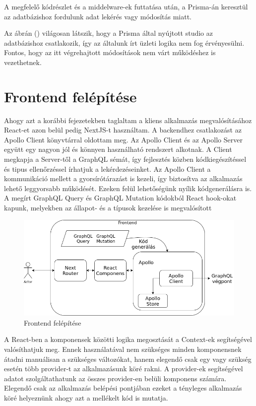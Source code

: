 A megfelelő kódrészlet és a middelware-ek futtatása után, a Prisma-án keresztül az adatbázishoz fordulunk adat lekérés vagy módosítás miatt.

Az ábrán () világosan látszik, hogy a Prisma által nyújtott studio az adatbázishoz csatlakozik, így az általunk írt üzleti logika nem fog érvényesülni.
Fontos, hogy az itt végrehajtott módosítások nem várt működéshez is vezethetnek.


\section{Frontend felépítése}

Ahogy azt a korábbi fejezetekben taglaltam a kliens alkalmazás megvalósításához React-et azon belül pedig NextJS-t használtam.
A backendhez csatlakozást az Apollo Client könyvtárral oldottam meg. 
Az Apollo Client és az Apollo Server együtt egy nagyon jól és könnyen használható rendszert alkotnak.
A Client megkapja a Server-től a GraphQL sémát, így fejlesztés közben kódkiegészítéssel és tipus ellenőrzéssel írhatjuk a lekérdezéseinket.
Az Apollo Client a kommunikáció mellett a gyorsírótárazást is kezeli, így biztosítva az alkalmazás lehető leggyorsabb működését.
Ezeken felül lehetőségünk nyílik kódgenerálásra is.
A megírt GraphQL Query és GraphQL Mutation kódokból React hook-okat kapunk, melyekben az állapot- és a típusok kezelése is megvalósított

\begin{figure}[!ht]
  \centering
  \includegraphics[width=150mm, keepaspectratio]{figures/frontend.png}
  \caption{Frontend felépítése}
  \label{fig:frontend}
\end{figure}

A React-ben a komponensek közötti logika megosztását a Context-ek segítségével valósíthatjuk meg.
Ennek használatával nem szükséges minden komponensnek átadni manuálisan a szükséges változókat, hanem elegendő csak egy vagy szükség esetén több provider-t az alkalmazásunk köré rakni.
A provider-ek segítségével adatot szolgáltathatunk az összes provider-en belüli komponens számára.
Elegendő csak az alkalmazás belépési pontjában ezeket a tényleges alkalmazás köré helyeznünk ahogy azt a mellékelt kód is mutatja.

